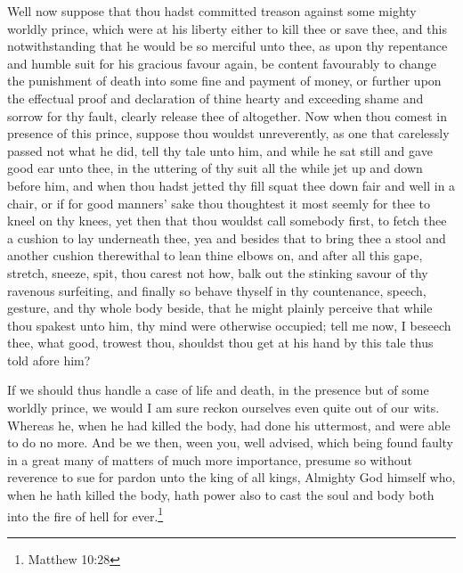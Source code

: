 \documentclass[a5paper]{scrbook}
\begin{document}
	Well now suppose that thou hadst committed treason against some mighty worldly prince, which were at his liberty either to kill thee or save thee, and this notwithstanding that he would be so merciful unto thee, as upon thy repentance and humble suit for his gracious favour again, be content favourably to change the punishment of death into some fine and payment of money, or further upon the effectual proof and declaration of thine hearty and exceeding shame and sorrow for thy fault, clearly release thee of altogether. Now when thou comest in presence of this prince, suppose thou wouldst unreverently, as one that carelessly passed not what he did, tell thy tale unto him, and while he sat still and gave good ear unto thee, in the uttering of thy suit all the while jet up and down before him, and when thou hadst jetted thy fill squat thee down fair and well in a chair, or if for good manners' sake thou thoughtest it most seemly for thee to kneel on thy knees, yet then that thou wouldst call somebody first, to fetch thee a cushion to lay underneath thee, yea and besides that to bring thee a stool and another cushion therewithal to lean thine elbows on, and after all this gape, stretch, sneeze, spit, thou carest not how, balk out the stinking savour of thy ravenous surfeiting, and finally so behave thyself in thy countenance, speech, gesture, and thy whole body beside, that he might plainly perceive that while thou spakest unto him, thy mind were otherwise occupied; tell me now, I beseech thee, what good, trowest thou, shouldst thou get at his hand by this tale thus told afore him?
	
	
	If we should thus handle a case of life and death, in the presence but of some worldly prince, we would I am sure reckon ourselves even quite out of our wits. Whereas he, when he had killed the body, had done his uttermost, and were able to do no more. And be we then, ween you, well advised, which being found faulty in a great many of matters of much more importance, presume so without reverence to sue for pardon unto the king of all kings, Almighty God himself who, when he hath killed the body, hath power also to cast the soul and body both into the fire of hell for ever.\footnote{Matthew 10:28}
	
\end{document}

